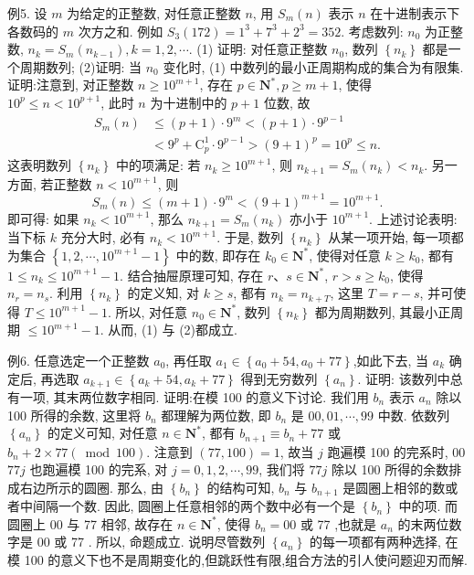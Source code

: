 例5. 设 $m$ 为给定的正整数, 对任意正整数 $n$, 用 $S_m(n)$ 表示 $n$ 在十进制表示下各数码的 $m$ 次方之和.
例如 $S_3(172)=1^3+7^3+2^3=352$. 考虑数列: $n_0$ 为正整数, $n_k=S_m\left(n_{k-1}\right), k=1,2, \cdots$.
(1) 证明: 对任意正整数 $n_0$, 数列 $\left\{n_k\right\}$ 都是一个周期数列;
(2)证明: 当 $n_0$ 变化时, (1) 中数列的最小正周期构成的集合为有限集.
证明:注意到, 对正整数 $n \geqslant 10^{m+1}$, 存在 $p \in \mathbf{N}^*, p \geqslant m+1$, 使得 $10^p \leqslant n<10^{p+1}$, 此时 $n$ 为十进制中的 $p+1$ 位数, 故
$$
\begin{aligned}
S_m(n) & \leqslant(p+1) \cdot 9^m<(p+1) \cdot 9^{p-1} \\
& <9^p+\mathrm{C}_p^1 \cdot 9^{p-1}>(9+1)^p=10^p \leqslant n .
\end{aligned}
$$
这表明数列 $\left\{n_k\right\}$ 中的项满足: 若 $n_k \geqslant 10^{m+1}$, 则 $n_{k+1}=S_m\left(n_k\right)<n_k$.
另一方面, 若正整数 $n<10^{m+1}$, 则
$$
S_m(n) \leqslant(m+1) \cdot 9^m<(9+1)^{m+1}=10^{m+1} .
$$
即可得: 如果 $n_k<10^{m+1}$, 那么 $n_{k+1}=S_m\left(n_k\right)$ 亦小于 $10^{m+1}$.
上述讨论表明: 当下标 $k$ 充分大时, 必有 $n_k<10^{m+1}$. 于是, 数列 $\left\{n_k\right\}$ 从某一项开始, 每一项都为集合 $\left\{1,2, \cdots, 10^{m+1}-1\right\}$ 中的数, 即存在 $k_0 \in \mathbf{N}^*$, 使得对任意 $k \geqslant k_0$, 都有 $1 \leqslant n_k \leqslant 10^{m+1}-1$. 结合抽屉原理可知, 存在 $r 、 s \in \mathbf{N}^*$, $r>s \geqslant k_0$, 使得 $n_r=n_s$. 利用 $\left\{n_k\right\}$ 的定义知, 对 $k \geqslant s$, 都有 $n_k=n_{k+T}$, 这里 $T=r-s$, 并可使得 $T \leqslant 10^{m+1}-1$.
所以, 对任意 $n_0 \in \mathbf{N}^*$, 数列 $\left\{n_k\right\}$ 都为周期数列, 其最小正周期 $\leqslant 10^{m+1}-1$. 从而, (1) 与 (2)都成立.



例6. 任意选定一个正整数 $a_0$, 再任取 $a_1 \in\left\{a_0+54, a_0+77\right\}$,如此下去, 当 $a_k$ 确定后, 再选取 $a_{k+1} \in\left\{a_k+54, a_k+77\right\}$ 得到无穷数列 $\left\{a_n\right\}$. 证明: 该数列中总有一项, 其末两位数字相同.
证明:在模 100 的意义下讨论.
我们用 $b_n$ 表示 $a_n$ 除以 100 所得的余数, 这里将 $b_n$ 都理解为两位数, 即 $b_n$ 是 $00,01, \cdots, 99$ 中数.
依数列 $\left\{a_n\right\}$ 的定义可知, 对任意 $n \in \mathbf{N}^*$, 都有 $b_{n+1} \equiv b_n+77$ 或 $b_n+2 \times 77(\bmod 100)$.
注意到 $(77,100)=1$, 故当 $j$ 跑遍模 100 的完系时, 00 $77 j$ 也跑遍模 100 的完系, 对 $j=0,1,2, \cdots, 99$, 我们将 $77 j$ 除以 100 所得的余数排成右边所示的圆圈.
那么, 由 $\left\{b_n\right\}$ 的结构可知, $b_n$ 与 $b_{n+1}$ 是圆圈上相邻的数或者中间隔一个数.
因此, 圆圈上任意相邻的两个数中必有一个是 $\left\{b_n\right\}$ 中的项.
而圆圈上 00 与 77 相邻, 故存在 $n \in \mathbf{N}^*$, 使得 $b_n=00$ 或 77 ,也就是 $a_n$ 的末两位数字是 00 或 77 .
所以, 命题成立.
说明尽管数列 $\left\{a_n\right\}$ 的每一项都有两种选择, 在模 100 的意义下也不是周期变化的,但跳跃性有限,组合方法的引人使问题迎刃而解.


